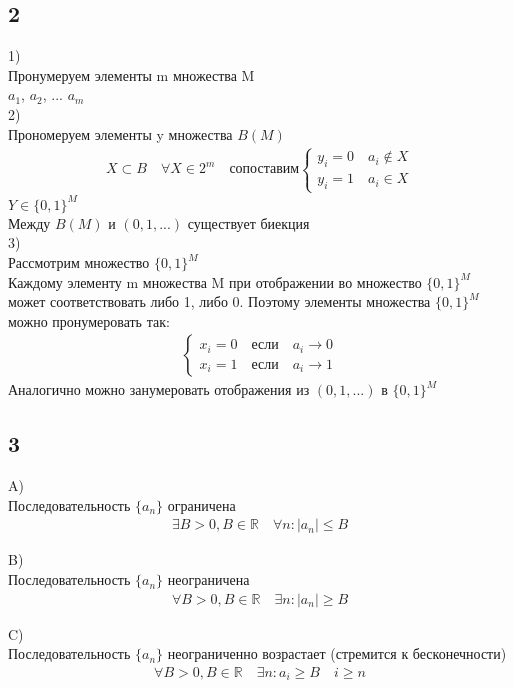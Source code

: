 		\subsection{2}
		1)\\
		Пронумеруем элементы m множества M\\
		$a_1$, $a_2$, ... $a_m$
		\\
		2)\\
		Прономеруем элементы y множества $B(M)$ \\
		\begin{gather*}
			X \subset B \quad \forall X \in 2^{m} \quad \text{сопоставим}
			\begin{cases}
				y_i = 0 \quad a_i \notin X \\
				y_i = 1 \quad a_i \in X 
			\end{cases}
		\end{gather*}
		$Y \in \{0, 1\}^M$\\
		Между $B(M)$ и $(0, 1, ...)$ существует биекция
		\\
		3)\\
		Рассмотрим множество $\{0, 1\}^M$ \\
		Каждому элементу m множества M при отображении во множество $\{0, 1\}^M$ может соответствовать либо 1, либо 0. Поэтому элементы множества $\{0, 1\}^M$ можно пронумеровать так:
		\begin{gather*}
			\begin{cases}
				x_i = 0 \quad \text{если} \quad a_i \longrightarrow 0 \\
				x_i = 1 \quad \text{если} \quad a_i \longrightarrow 1 
			\end{cases}
		\end{gather*}
		Аналогично можно занумеровать отображения из $(0, 1, ...)$ в $\{0, 1\}^M$
		\\
		
		\subsection{3}
		A)\\
		Последовательность $\{ a_n \}$ ограничена\\
		\begin{gather*}
			\exists B > 0, B \in \mathbb{R} \quad \forall n: |a_n| \leq B
		\end{gather*}
		
		B)\\
		Последовательность $\{ a_n \}$ неограничена\\
		\begin{gather*}
			\forall B > 0, B \in \mathbb{R} \quad  \exists n: |a_n| \geq B
		\end{gather*}
		
		C)\\
		Последовательность $\{ a_n \}$ неограниченно возрастает (стремится к бесконечности)\\
		\begin{gather*}
			\forall B > 0, B \in \mathbb{R} \quad  \exists n: a_i \geq B \quad i\geq n
		\end{gather*}